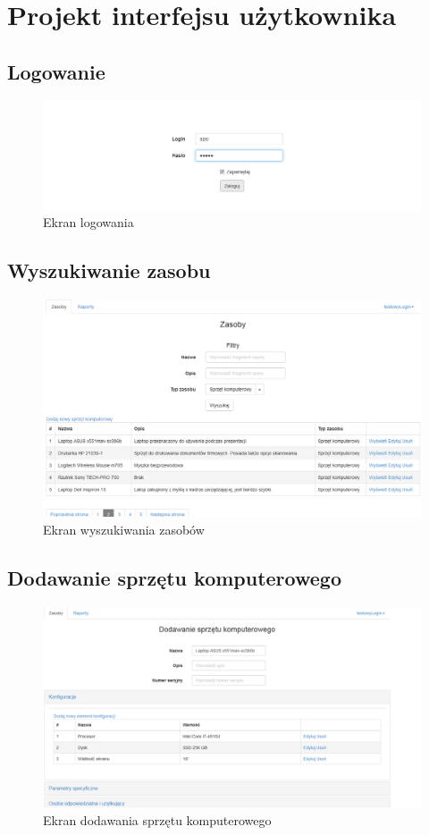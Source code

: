 \section{Projekt interfejsu użytkownika}
\subsection{Logowanie}
\begin{figure}[h!]
	\centering
	\includegraphics[scale=0.4]{img/screens/logowanie.png}
	\caption{Ekran logowania}
\end{figure}

\subsection{Wyszukiwanie zasobu}
\begin{figure}[h!]
	\centering
	\includegraphics[scale=0.4]{img/screens/wyszZasob.png}
	\caption{Ekran wyszukiwania zasobów}
\end{figure}

\subsection{Dodawanie sprzętu komputerowego}
\begin{figure}[h!]
	\centering
	\includegraphics[scale=0.4]{img/screens/dodawanieSprzetuKomputerowego.png}
	\caption{Ekran dodawania sprzętu komputerowego}
\end{figure}

